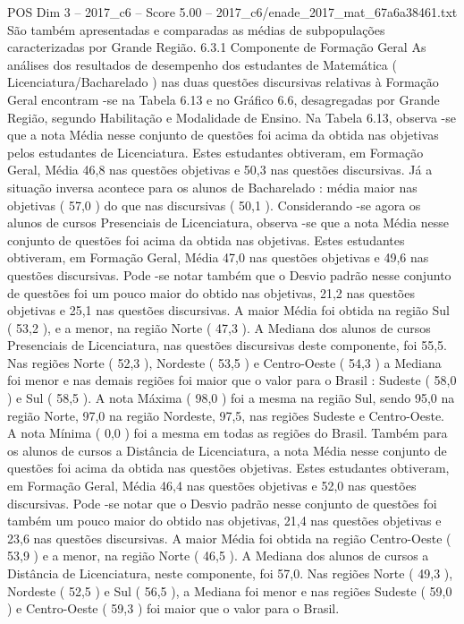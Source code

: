 \begin{textsample}{POS Dim 3 – 2017\_c6 – Score 5.00 – 2017\_c6/enade\_2017\_mat\_67a6a38461.txt}
São também apresentadas e comparadas as médias de subpopulações caracterizadas por Grande Região. 6.3.1 Componente de Formação Geral As análises dos resultados de desempenho dos estudantes de Matemática ( Licenciatura/Bacharelado ) nas duas questões discursivas relativas à Formação Geral encontram -se na Tabela 6.13 e no Gráfico 6.6, desagregadas por Grande Região, segundo Habilitação e Modalidade de Ensino.
Na Tabela 6.13, observa -se que a nota Média nesse conjunto de questões foi acima da obtida nas objetivas pelos estudantes de Licenciatura.
Estes estudantes obtiveram, em Formação Geral, Média 46,8 nas questões objetivas e 50,3 nas questões discursivas.
Já a situação inversa acontece para os alunos de Bacharelado : média maior nas objetivas ( 57,0 ) do que nas discursivas ( 50,1 ).
Considerando -se agora os alunos de cursos Presenciais de Licenciatura, observa -se que a nota Média nesse conjunto de questões foi acima da obtida nas objetivas.
Estes estudantes obtiveram, em Formação Geral, Média 47,0 nas questões objetivas e 49,6 nas questões discursivas.
Pode -se notar também que o Desvio padrão nesse conjunto de questões foi um pouco maior do obtido nas objetivas, 21,2 nas questões objetivas e 25,1 nas questões discursivas.
A maior Média foi obtida na região Sul ( 53,2 ), e a menor, na região Norte ( 47,3 ).
A Mediana dos alunos de cursos Presenciais de Licenciatura, nas questões discursivas deste componente, foi 55,5.
Nas regiões Norte ( 52,3 ), Nordeste ( 53,5 ) e Centro-Oeste ( 54,3 ) a Mediana foi menor e nas demais regiões foi maior que o valor para o Brasil : Sudeste ( 58,0 ) e Sul ( 58,5 ).
A nota Máxima ( 98,0 ) foi a mesma na região Sul, sendo 95,0 na região Norte, 97,0 na região Nordeste, 97,5, nas regiões Sudeste e Centro-Oeste.
A nota Mínima ( 0,0 ) foi a mesma em todas as regiões do Brasil.
Também para os alunos de cursos a Distância de Licenciatura, a nota Média nesse conjunto de questões foi acima da obtida nas questões objetivas.
Estes estudantes obtiveram, em Formação Geral, Média 46,4 nas questões objetivas e 52,0 nas questões discursivas.
Pode -se notar que o Desvio padrão nesse conjunto de questões foi também um pouco maior do obtido nas objetivas, 21,4 nas questões objetivas e 23,6 nas questões discursivas.
A maior Média foi obtida na região Centro-Oeste ( 53,9 ) e a menor, na região Norte ( 46,5 ).
A Mediana dos alunos de cursos a Distância de Licenciatura, neste componente, foi 57,0.
Nas regiões Norte ( 49,3 ), Nordeste ( 52,5 ) e Sul ( 56,5 ), a Mediana foi menor e nas regiões Sudeste ( 59,0 ) e Centro-Oeste ( 59,3 ) foi maior que o valor para o Brasil.

\end{textsample}
